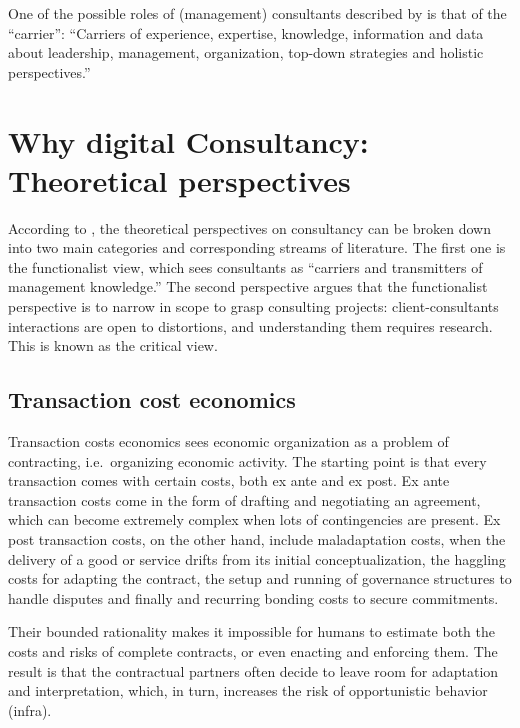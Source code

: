 \documentclass[12pt]{article}
\begin{document}
One of the possible roles of (management) consultants described by
\citet[269]{furusten2009} is that of the ``carrier'': ``Carriers of
experience, expertise, knowledge, information and data about leadership,
management, organization, top-down strategies and holistic
perspectives.''

\hypertarget{why-digital-consultancy-theoretical-perspectives}{%
\section{Why digital Consultancy: Theoretical
perspectives}\label{why-digital-consultancy-theoretical-perspectives}}

According to \citet[3-6]{armbruster2006}, the theoretical perspectives
on consultancy can be broken down into two main categories and
corresponding streams of literature. The first one is the functionalist
view, which sees consultants as ``carriers and transmitters of
management knowledge.'' The second perspective argues that the
functionalist perspective is to narrow in scope to grasp consulting
projects: client-consultants interactions are open to distortions, and
understanding them requires research. This is known as the critical
view.

\hypertarget{transaction-cost-economics}{%
\subsection{Transaction cost
economics}\label{transaction-cost-economics}}

Transaction costs economics sees economic organization as a problem of
contracting, i.e.~organizing economic activity. The starting point is
that every transaction comes with certain costs, both ex ante and ex
post. Ex ante transaction costs come in the form of drafting and
negotiating an agreement, which can become extremely complex when lots
of contingencies are present. Ex post transaction costs, on the other
hand, include maladaptation costs, when the delivery of a good or
service drifts from its initial conceptualization, the haggling costs
for adapting the contract, the setup and running of governance
structures to handle disputes and finally and recurring bonding costs to
secure commitments.

Their bounded rationality makes it impossible for humans to estimate
both the costs and risks of complete contracts, or even enacting and
enforcing them. \citep[ 53]{aubert1996} The result is that the
contractual partners often decide to leave room for adaptation and
interpretation, which, in turn, increases the risk of opportunistic
behavior (infra).
\end{document}
